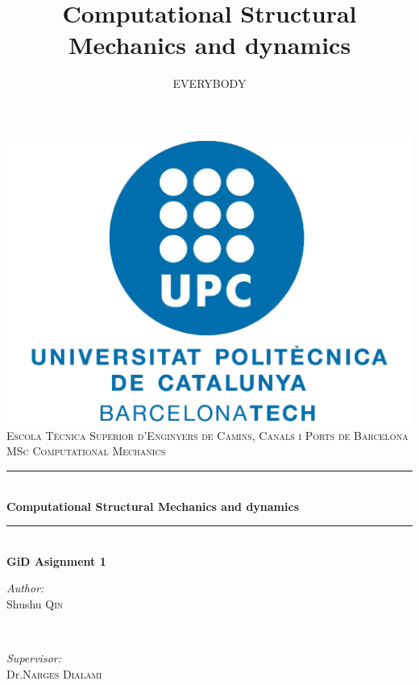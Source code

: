 \documentclass[a4paper,12pt,twoside,english]{article}
\newcommand{\HRule}{\rule{\linewidth}{0.5mm}} %
\begin{document}
\title{Computational Structural Mechanics and dynamics}
\author{EVERYBODY}
\begin{titlepage}
\center
\includegraphics[width=0.8\linewidth]{Figures/UPC.pdf}\\[1cm]
\textsc{\Large Escola Tècnica Superior d'Enginyers de Camins, Canals i Ports de Barcelona}\\[0.5cm]
\textsc{\large MSc Computational Mechanics}\\[0.5cm]
\HRule \\[0.4cm]
{ \Huge \bfseries Computational Structural Mechanics and dynamics}\\[0.3cm]
\HRule\\[0.4cm]
{ \LARGE \bfseries GiD Asignment 1}\\[0.4cm]
\begin{minipage}{0.4\textwidth}
\begin{flushleft} \large
\emph{Author:}\\
Shushu \textsc{Qin}\\

\end{flushleft}
\end{minipage}
~
\begin{minipage}{0.4\textwidth}
\begin{flushright} \large
\emph{Supervisor:}\\
Dr.\textsc{Narges Dialami}
\end{flushright}
\end{minipage}\\[2cm]
\vfill %
\end{titlepage}
\end{document}
